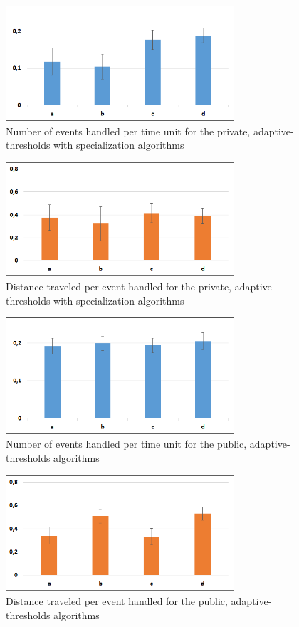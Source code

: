 	\begin{figure}[thpb]
      \centering
      \includegraphics[width=8.5cm]{Pictures/PrivSpecMetric1.png}
      \caption{Number of events handled per time unit for the private, adaptive-thresholds with specialization algorithms}
      \label{figure5}
   \end{figure}
	\begin{figure}[thpb]
      \centering
      \includegraphics[width=8.5cm]{Pictures/PrivSpecMetric2.png}
      \caption{Distance traveled per event handled for the private, adaptive-thresholds with specialization algorithms}
      \label{figure6}
   \end{figure}
	\begin{figure}[thpb]
      \centering
      \includegraphics[width=8.5cm]{Pictures/PrivAdaptMetric1.png}
      \caption{Number of events handled per time unit for the public, adaptive-thresholds algorithms}
      \label{figure7}
   \end{figure}
	\begin{figure}[thpb]
      \centering
      \includegraphics[width=8.5cm]{Pictures/PrivAdaptMetric2.png}
      \caption{Distance traveled per event handled for the public, adaptive-thresholds algorithms}
      \label{figure8}
   \end{figure}


